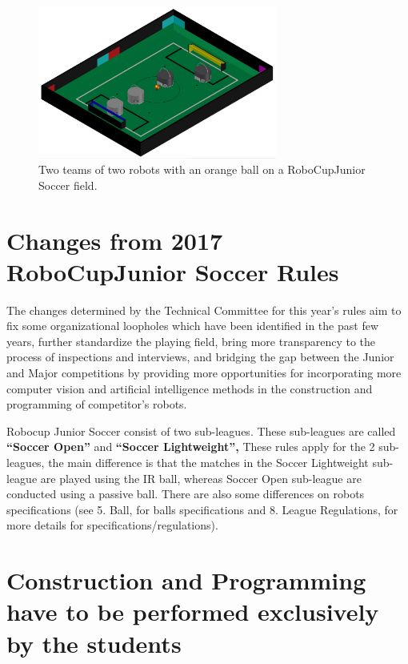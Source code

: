 \documentclass{article}
\begin{document}
\begin{figure}[H]
    \centering
    \includegraphics[width=0.7\textwidth]{media/image1.jpeg}
    \caption{Two teams of two robots with an orange ball on a RoboCupJunior
        Soccer field.}
    \label{fig:name}
\end{figure}



\section*{Changes from 2017 RoboCupJunior Soccer Rules}

The changes determined by the Technical Committee for this year's rules aim to fix some organizational loopholes which have been identified in the past few years, further standardize the playing field, bring more transparency to the process of inspections and interviews, and bridging the gap between the Junior and Major competitions by providing more opportunities for incorporating more computer vision and artificial intelligence methods in the construction and programming of competitor's robots.

Robocup Junior Soccer consist of two sub-leagues. These sub-leagues are called \textbf{``Soccer Open''} and \textbf{``Soccer Lightweight'',} These rules apply for the 2 sub-leagues, the main difference is that the matches in the Soccer Lightweight sub-league are played using the IR ball, whereas Soccer Open sub-league are conducted using a passive ball. There are also some differences on robots specifications (see 5. Ball, for balls specifications and 8. League Regulations, for more details for specifications/regulations).

\section*{Construction and Programming have to be performed exclusively by the students}
\end{document}
